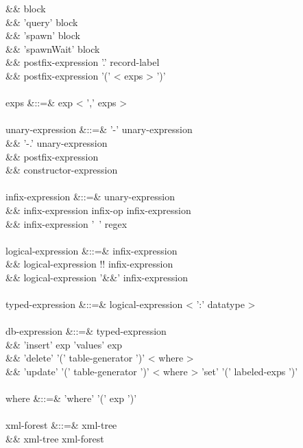 \documentclass[11pt,a4paper]{article}
\begin{document}
\begin{grammar}
&&                        block \\
&&                        'query' block \\
&&                        'spawn' block \\
&&                        'spawnWait' block \\
&&                        postfix-expression '.' record-label \\
&&                        postfix-expression '(' < exps > ')' \\
\\
exps &::=& exp < ',' exps >  \\
\\
unary-expression &::=& '-' unary-expression \\
&&                     '-.' unary-expression \\
&&                     postfix-expression \\
&&                     constructor-expression \\
\\
infix-expression &::=& unary-expression \\
&&                     infix-expression infix-op infix-expression \\
&&                     infix-expression '~' regex \\
\\
logical-expression &::=& infix-expression \\
&&                       logical-expression !! infix-expression \\
&&                       logical-expression '&&' infix-expression \\
\\
typed-expression &::=& logical-expression < ':' datatype > \\
\\
db-expression &::=& typed-expression \\
&&                  'insert' exp 'values' exp \\
&&                  'delete' '(' table-generator ')' < where >  \\
&&                  'update' '(' table-generator ')' < where > 'set' '(' labeled-exps ')' \\
\\
where &::=& 'where' '(' exp ')' \\
\\
xml-forest &::=& xml-tree \\
&&               xml-tree xml-forest \\

\end{grammar}
\end{document}

